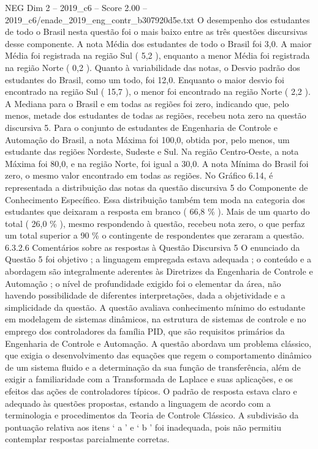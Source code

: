 \begin{textsample}{NEG Dim 2 – 2019\_c6 – Score 2.00 – 2019\_c6/enade\_2019\_eng\_contr\_b307920d5e.txt}
O desempenho dos estudantes de todo o Brasil nesta questão foi o mais baixo entre as três questões discursivas desse componente.
A nota Média dos estudantes de todo o Brasil foi 3,0.
A maior Média foi registrada na região Sul ( 5,2 ), enquanto a menor Média foi registrada na região Norte ( 0,2 ).
Quanto à variabilidade das notas, o Desvio padrão dos estudantes do Brasil, como um todo, foi 12,0.
Enquanto o maior desvio foi encontrado na região Sul ( 15,7 ), o menor foi encontrado na região Norte ( 2,2 ).
A Mediana para o Brasil e em todas as regiões foi zero, indicando que, pelo menos, metade dos estudantes de todas as regiões, recebeu nota zero na questão discursiva 5.
Para o conjunto de estudantes de Engenharia de Controle e Automação do Brasil, a nota Máxima foi 100,0, obtida por, pelo menos, um estudante das regiões Nordeste, Sudeste e Sul.
Na região Centro-Oeste, a nota Máxima foi 80,0, e na região Norte, foi igual a 30,0.
A nota Mínima do Brasil foi zero, o mesmo valor encontrado em todas as regiões.
No Gráfico 6.14, é representada a distribuição das notas da questão discursiva 5 do Componente de Conhecimento Específico.
Essa distribuição também tem moda na categoria dos estudantes que deixaram a resposta em branco ( 66,8 \% ).
Mais de um quarto do total ( 26,0 \% ), mesmo respondendo à questão, recebeu nota zero, o que perfaz um total superior a 90 \% o contingente de respondentes que zeraram a questão. 6.3.2.6 Comentários sobre as respostas à Questão Discursiva 5 O enunciado da Questão 5 foi objetivo ; a linguagem empregada estava adequada ; o conteúdo e a abordagem são integralmente aderentes às Diretrizes da Engenharia de Controle e Automação ; o nível de profundidade exigido foi o elementar da área, não havendo possibilidade de diferentes interpretações, dada a objetividade e a simplicidade da questão.
A questão avaliava conhecimento mínimo do estudante em modelagem de sistemas dinâmicos, na estrutura de sistemas de controle e no emprego dos controladores da família PID, que são requisitos primários da Engenharia de Controle e Automação.
A questão abordava um problema clássico, que exigia o desenvolvimento das equações que regem o comportamento dinâmico de um sistema fluido e a determinação da sua função de transferência, além de exigir a familiaridade com a Transformada de Laplace e suas aplicações, e os efeitos das ações de controladores típicos.
O padrão de resposta estava claro e adequado às questões propostas, estando a linguagem de acordo com a terminologia e procedimentos da Teoria de Controle Clássico.
A subdivisão da pontuação relativa aos itens ‘ a ’ e ‘ b ’ foi inadequada, pois não permitiu contemplar respostas parcialmente corretas.

\end{textsample}
